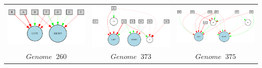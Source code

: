\begin{table}[h]
\begin{tabular}{ccc}
\includegraphics[scale=0.4]{include/images/sim_network_4.PNG} & \includegraphics[scale=0.4]{include/images/sim_network_5.PNG} & \includegraphics[scale=0.4]{include/images/sim_network_6.PNG} \\
$Genome \;  \; 260$  & $Genome \;  \; 373$  & $Genome \;  \; 375$  \\

\end{tabular}
\end{table}

